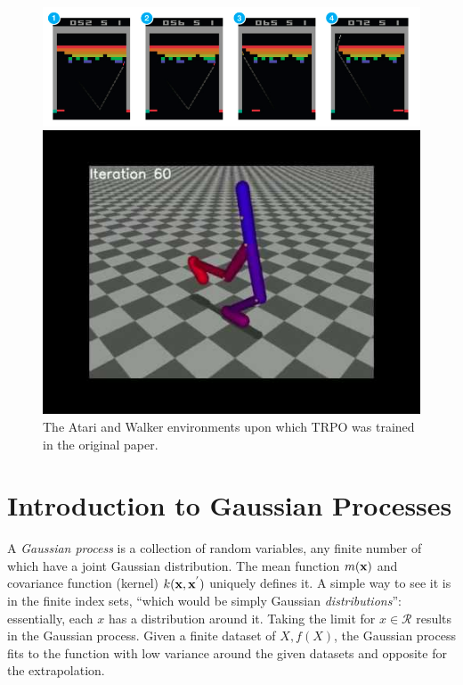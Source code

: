\documentclass[final]{beamer}
\begin{document}
\begin{frame}[t]
\begin{multicols}{3}
\begin{figure}[h]
  \includegraphics{atari.png}

  \includegraphics{walker.jpg}
  \caption{The Atari and Walker environments upon which TRPO was trained in the original paper.}
\end{figure}



\section{Introduction to Gaussian Processes}


A \textit{Gaussian process} is a collection of random variables, any finite number of which have a joint Gaussian distribution. The mean function $m(\bold{x})$ and covariance function (kernel) $k(\bold{x}, \bold{x}^{'} )$ uniquely defines it. A simple way to see it is in the finite index sets, ``which would be simply Gaussian \textit{distributions}'': essentially, each $x$ has a distribution around it. Taking the limit for $x \in \mathcal{R}$ results in the Gaussian process. Given a finite dataset of $X, f(X)$, the Gaussian process fits to the function with low variance around the given datasets and opposite for the extrapolation.


\end{multicols}
\end{frame}
\end{document}
